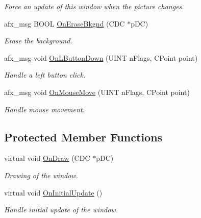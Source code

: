 \begin{DoxyCompactItemize}
\begin{DoxyCompactList}\small\item\em Force an update of this window when the picture changes. \end{DoxyCompactList}\item 
afx\+\_\+msg B\+O\+O\+L \hyperlink{class_c_view_edit_a66446b22920245bb3b5c5735754d63cd}{On\+Erase\+Bkgnd} (C\+D\+C $\ast$p\+D\+C)
\begin{DoxyCompactList}\small\item\em Erase the background. \end{DoxyCompactList}\item 
afx\+\_\+msg void \hyperlink{class_c_view_edit_a0e77d59dd1ed299c933f660d9ff0cf7e}{On\+L\+Button\+Down} (U\+I\+N\+T n\+Flags, C\+Point point)
\begin{DoxyCompactList}\small\item\em Handle a left button click. \end{DoxyCompactList}\item 
afx\+\_\+msg void \hyperlink{class_c_view_edit_aba0b38ee4b51f9d98bc08ade92d9f051}{On\+Mouse\+Move} (U\+I\+N\+T n\+Flags, C\+Point point)
\begin{DoxyCompactList}\small\item\em Handle mouse movement. \end{DoxyCompactList}\end{DoxyCompactItemize}
\subsection*{Protected Member Functions}
\begin{DoxyCompactItemize}
\item 
virtual void \hyperlink{class_c_view_edit_a8cf50c2cebab5aaecda5ae6f7437cf38}{On\+Draw} (C\+D\+C $\ast$p\+D\+C)
\begin{DoxyCompactList}\small\item\em Drawing of the window. \end{DoxyCompactList}\item 
\hypertarget{class_c_view_edit_ac49ed2e9e35cd014c6539aaa4ac705f3}{virtual void \hyperlink{class_c_view_edit_ac49ed2e9e35cd014c6539aaa4ac705f3}{On\+Initial\+Update} ()}\label{class_c_view_edit_ac49ed2e9e35cd014c6539aaa4ac705f3}

\begin{DoxyCompactList}\small\item\em Handle initial update of the window. \end{DoxyCompactList}\end{DoxyCompactItemize}


